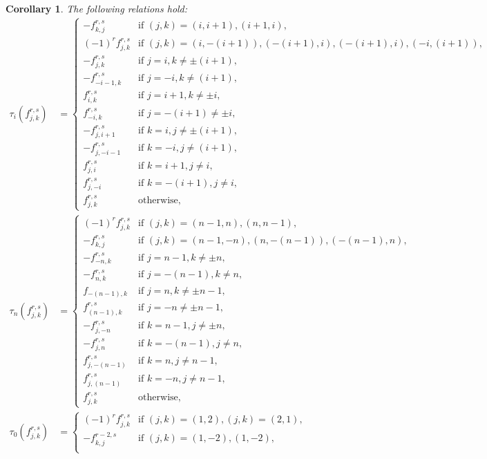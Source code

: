 \documentclass[pdftex]{sigma}
\numberwithin{equation}{section}
\newtheorem{Corollary}[Theorem]{Corollary}
\theoremstyle{definition}
\begin{document}
\begin{Corollary}\label{Cor25}
The following relations hold:{\samepage
\begin{align*}
\tau_i(f_{j,k}^{r,s})&=\begin{cases}
-f_{k,j}^{r,s}&\text{if }(j,k)=(i,i+1),(i+1,i),\\
(-1)^rf_{j,k}^{r,s}&\text{if }(j,k)=(i,-(i+1)),(-(i+1),i),(-(i+1),i),(-i,(i+1)),\\
-f_{j,k}^{r,s}&\text{if }j=i,k\neq\pm(i+1),\\
-f_{-i-1,k}^{r,s}&\text{if }j=-i,k\neq(i+1),\\
f_{i,k}^{r,s}&\text{if }j=i+1,k\neq \pm i,\\
f_{-i,k}^{r,s}&\text{if }j=-(i+1)\neq \pm i,\\
-f_{j,i+1}^{r,s}&\text{if }k=i,j\neq\pm(i+1),\\
-f_{j,-i-1}^{r,s}&\text{if }k=-i,j\neq(i+1),\\
f_{j,i}^{r,s}&\text{if }k=i+1,j\neq i,\\
f_{j,-i}^{r,s}&\text{if }k=-(i+1),j\neq i,\\
f_{j,k}^{r,s}&\text{otherwise},
\end{cases}\\
\tau_n(f_{j,k}^{r,s})&=\begin{cases}
(-1)^rf_{j,k}^{r,s}&\text{if }(j,k)=(n-1,n),(n,n-1),\\
-f_{k,j}^{r,s}&\text{if }(j,k)=(n-1,-n),(n,-(n-1)),(-(n-1),n),\\
-f_{-n,k}^{r,s}&\text{if }j=n-1,k\neq\pm n,\\
-f_{n,k}^{r,s}&\text{if }j=-(n-1),k\neq n,\\
f_{-(n-1),k}&\text{if }j=n,k\neq \pm n-1,\\
f_{(n-1),k}^{r,s}&\text{if }j=-n\neq \pm n-1,\\
-f_{j,-n}^{r,s}&\text{if }k=n-1,j\neq\pm n,\\
-f_{j,n}^{r,s}&\text{if }k=-(n-1),j\neq n,\\
f_{j,-(n-1)}^{r,s}&\text{if }k=n,j\neq n-1,\\
f_{j,(n-1)}^{r,s}&\text{if }k=-n,j\neq n-1,\\
f_{j,k}^{r,s}&\text{otherwise},
\end{cases}\\
\tau_0(f_{j,k}^{r,s})&=\begin{cases}
(-1)^rf_{j,k}^{r,s}&\text{if }(j,k)=(1,2),(j,k)=(2,1),\\
-f_{k,j}^{r-2,s}&\text{if }(j,k)=(1,-2),(1,-2),\\

\end{cases}
\end{align*}}
\end{Corollary}
\end{document}
